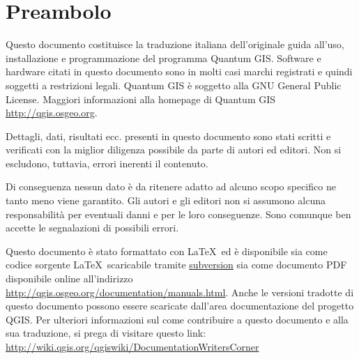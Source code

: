 
\newcommand\qgistip[1]{\raggedright\small{#1}}
\renewcommand{\topfraction}{0.85}
\renewcommand{\textfraction}{0.1}
\renewcommand{\floatpagefraction}{0.75}
\thispagestyle{empty}
\cleardoublepage
{}
{}


\section*{Preambolo}


\vspace{1cm}



Questo documento costituisce la traduzione italiana dell'originale
guida all'uso, installazione e programmazione del programma Quantum
GIS. Software e hardware citati in questo documento sono in
molti casi marchi registrati e quindi soggetti a restrizioni
legali. Quantum GIS è soggetto alla GNU General Public License. Maggiori
informazioni alla homepage di Quantum GIS
\url{http://qgis.osgeo.org}.

Dettagli, dati, risultati ecc. presenti in questo documento sono stati
scritti e verificati con la miglior diligenza possibile da parte di autori
ed editori. Non si escludono, tuttavia, errori inerenti il contenuto.

Di conseguenza nessun dato è da ritenere adatto ad alcuno scopo specifico
ne tanto meno viene garantito. Gli autori e gli editori non si assumono alcuna responsabilità per eventuali
danni e per le loro conseguenze. Sono comunque ben accette le segnalazioni
di possibili errori.

Questo documento è stato formattato con \LaTeX~ed è disponibile sia come codice sorgente \LaTeX~scaricabile
tramite \href{http://wiki.qgis.org/qgiswiki/DocumentationWritersCorner}{subversion} sia
come documento PDF disponibile online all'indirizzo \url{http://qgis.osgeo.org/documentation/manuals.html}.
Anche le versioni tradotte di questo documento possono essere scaricate dall'area documentazione
del progetto QGIS. Per ulteriori informazioni sul come contribuire a questo documento e alla sua
traduzione, si prega di visitare questo link:
\url{http://wiki.qgis.org/qgiswiki/DocumentationWritersCorner}

